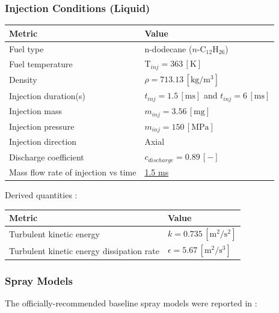 \subsubsection*{Injection Conditions (Liquid)}
\begin{center}
\begin{tabular}{ll}
\hline
Metric & Value \\
\hline
Fuel type & n-dodecane ($n\text{-}\mathrm{C}_{12}\mathrm{H}_{26}$) \\
Fuel temperature & $\mathrm{T}_{inj} = 363 \, [\mathrm{K}]$ \\
Density & $\rho = 713.13 \, [\mathrm{kg}/\mathrm{m}^3]$ \\
Injection duration(s) & $t_{inj} = 1.5 \, [\mathrm{ms}]$ and $t_{inj} = 6 \, [\mathrm{ms}]$ \\
Injection mass & $m_{inj} = 3.56 \, [\mathrm{mg}]$ \\
Injection pressure & $m_{inj} = 150 \, [\mathrm{MPa}]$ \\
Injection direction & Axial \\
Discharge coefficient & $c_{discharge} = 0.89 \, [-]$ \\
Mass flow rate of injection vs time & \href{resources/massFlowRateOfInjection_1.5}{1.5 ms} \\
\hline
\end{tabular}
\end{center}

Derived quantities \cite{ref7}:\\
\begin{center}
\begin{tabular}{ll}
\hline
Metric & Value \\
\hline
Turbulent kinetic energy & $k = 0.735 \, [\mathrm{m}^2/\mathrm{s}^2]$ \\
Turbulent kinetic energy dissipation rate & $\epsilon = 5.67 \, [\mathrm{m}^2/\mathrm{s}^3]$ \\
\hline
\end{tabular}
\end{center}

\subsubsection*{Spray Models}
The officially-recommended baseline spray models were reported in \cite{ref3, ref5}:

